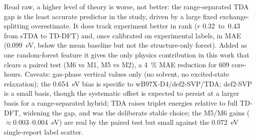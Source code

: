 \documentclass[final,3p,times,twocolumn]{elsarticle}
\begin{document}
Read raw, a higher level of theory is worse, not better: the range-separated
TDA gap is the least accurate predictor in the study, driven by a large
fixed exchange-splitting overestimate. It does track experiment better in rank
($r$ \num{0.32}~to~\num{0.43} from sTDA to TD-DFT) and, once calibrated on
experimental labels, in MAE (\qty{0.099}{\electronvolt}, below the mean baseline
but not the structure-only forest). Added as one random-forest feature it gives
the only physics contribution in this work that clears a paired test
(M6 vs M1, M5 vs M2), a \qty{4}{\percent} MAE reduction for \num{609}
core-hours. Caveats: gas-phase vertical values only (no solvent, no
excited-state relaxation); the \qty{+0.654}{\electronvolt} bias is specific to
wB97X-D4/def2-SVP/TDA; def2-SVP is a small basis, though the systematic offset
is expected to persist at a larger basis for a range-separated hybrid; TDA raises triplet
energies relative to full TD-DFT, widening the gap, and was the deliberate stable
choice; the M5/M6 gains ($\approx$\qty{0.003}{}--\qty{0.004}{\electronvolt}) are
real by the paired test but small against the \qty{0.072}{\electronvolt}
single-report label scatter.

\end{document}

